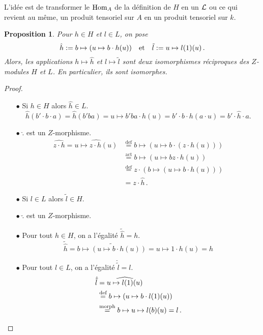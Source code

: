 \documentclass[francais,a4paper,11pt,reqno]{amsart}
\theoremstyle{plain}
\newtheorem{PROP}[THEO]{\bf Proposition}
\theoremstyle{definition}
\theoremstyle{remark}
\newcommand{\act}{\cdot}
\newcommand\eqcom[1]{\mathrel{\overset{\text{#1}}{=}}}
\begin{document}
L'idée est de transformer le $\operatorname{Hom}_A$ de la définition de $H$ en un $\operatorname{\mathcal L}$ ou
ce qui revient au même, un produit tensoriel sur $A$ en un produit tensoriel
sur $k$.
\begin{PROP}
  Pour $h\in H$ et $l\in L$, on pose
  \begin{equation}
    \hat{h} := b \mapsto (u \mapsto b\act h(u))
    \qandq
    \tilde{l} := u \mapsto l(1)(u)\,.
  \end{equation}
  Alors, les applications $h\mapsto\hat{h}$ et $l\mapsto\tilde{l}$ sont deux
  isomorphismes réciproques des $Z$-modules $H$ et $L$. En particulier, ils
  sont isomorphes.
\end{PROP}
\begin{proof}
  \begin{itemize}
  \item[$\bullet$] Si $h\in H$ alors $\hat{h}\in L$.
    \begin{equation}
      \hat h(b'\act b\act a) = \hat h(b'ba) = u\mapsto b'ba \act h(u)
      = b'\act b\act h(a\act u) = b' \act \hat{h} \act a.
    \end{equation}
  \item[$\bullet$] $\hat{.}$ est un $Z$-morphisme.
    \begin{align}
      \widehat{z\act h} = \widehat{u\mapsto z\act h(u)}
      &\eqcom{def}b\mapsto(u\mapsto b\act(z\act h(u)))\\
      &\eqcom{act}b\mapsto(u\mapsto bz\act h(u))\\
      &\eqcom{def}z\act(b\mapsto(u\mapsto b\act h(u)))\\
      &=z\act\hat{h}\,.
    \end{align}
  \item[$\bullet$] Si $l\in L$ alors $\tilde{l}\in H$.
    \TODO{}
  \item[$\bullet$] $\tilde{.}$ est un $Z$-morphisme.
    \TODO{}
  \item[$\bullet$] Pour tout $h\in H$, on a l'égalité $\tilde{\hat{h}} = h$.
    \begin{equation}
      \tilde{\hat{h}} = \widetilde{b \mapsto (u \mapsto b\act h(u))}
      = u \mapsto 1\act h(u) = h
    \end{equation}
  \item[$\bullet$] Pour tout $l\in L$, on a l'égalité $\hat{\tilde{l}} = l$.
    \begin{align}
      \hat{\tilde{l}} &= \widehat{u \mapsto l(1)(u)}\\
      &\eqcom{def}b \mapsto (u \mapsto b\act l(1)(u)) \\
      &\eqcom{morph}b \mapsto u \mapsto l(b)(u) = l\,.\qedhere
    \end{align}
  \end{itemize}
\end{proof}
\end{document}

